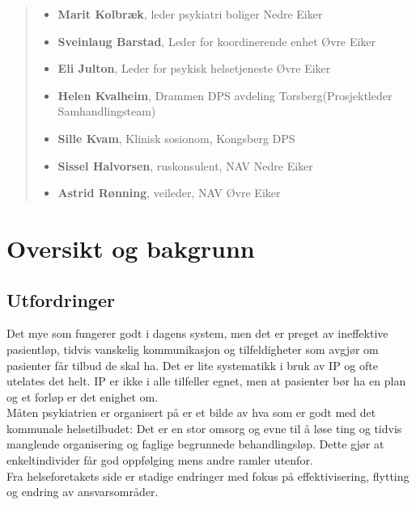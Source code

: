 \documentclass[11pt]{report} %
\begin{document}
\begin{abstract}
\begin{itemize}
                \item \textbf{Marit Kolbræk}, leder psykiatri boliger Nedre Eiker\\
                \item \textbf{Sveinlaug Barstad}, Leder for koordinerende enhet Øvre Eiker\\
                \item \textbf{Eli Julton}, Leder for psykisk helsetjeneste Øvre Eiker\\
                \item \textbf{Helen Kvalheim}, Drammen DPS avdeling Torsberg(Prosjektleder Samhandlingsteam)\\
                \item \textbf{Sille Kvam}, Klinisk sosionom, Kongsberg DPS\\
                \item \textbf{Sissel Halvorsen}, ruskonsulent, NAV Nedre Eiker\\
                \item \textbf{Astrid Rønning}, veileder, NAV Øvre Eiker\\
              \end{itemize}

              \end{abstract}

              \renewcommand{\chaptername}{Del}
              \renewcommand{\contentsname}{Innhold}
              \renewcommand\listfigurename{Bilder og tabeller}
              \tableofcontents

              \chapter{Oversikt og bakgrunn}\label{chap:ov}

                \section{Utfordringer}\label{sec:ov_utf}
                  Det mye som fungerer godt i dagens system, men det er preget av ineffektive pasientløp, tidvis vanskelig kommunikasjon og tilfeldigheter som avgjør om pasienter får tilbud de skal ha. Det er lite systematikk i bruk av IP og ofte utelates det helt. IP er ikke i alle tilfeller egnet, men at pasienter bør ha en plan og et forløp er det enighet om. \\
                  Måten psykiatrien er organisert på er et bilde av hva som er godt med det kommunale helsetilbudet: Det er en stor omsorg og evne til å løse ting og tidvis manglende organisering og faglige begrunnede behandlingsløp\label{stor_vilje_til_hjelp}. Dette gjør at enkeltindivider får god oppfølging mens andre ramler utenfor. \\
                  Fra helseforetakets side er stadige endringer med fokus på effektivisering, flytting og endring av ansvarsområder.\\
\end{document}
